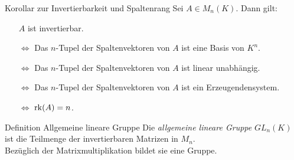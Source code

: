 \documentclass[main.tex]{subfiles}
\begin{document}
\begin{karte}{Korollar zur Invertierbarkeit und Spaltenrang}
    Sei \(A \in M_n(K)\). Dann gilt:
    \begin{itemize}
        \item[] \(A\) ist invertierbar.
        \item[\(\Leftrightarrow\)] Das \(n\)-Tupel der 
        Spaltenvektoren von \(A\) ist eine Basis von \(K^n\).
        \item[\(\Leftrightarrow\)] Das \(n\)-Tupel der 
        Spaltenvektoren von \(A\) ist linear unabhängig.
        \item[\(\Leftrightarrow\)] Das \(n\)-Tupel der 
        Spaltenvektoren von \(A\) ist ein Erzeugendensystem. 
        \item[\(\Leftrightarrow\)] \(\operatorname{rk}(A) = n\).        
    \end{itemize}
\end{karte}
\begin{karte}{Definition Allgemeine lineare Gruppe}
    Die \textit{allgemeine lineare Gruppe} \(GL_n(K)\) ist die Teilmenge 
    der invertierbaren Matrizen in \(M_n\). \\ 
    Bezüglich der Matrixmultiplikation bildet sie eine Gruppe.
\end{karte}
\end{document}

